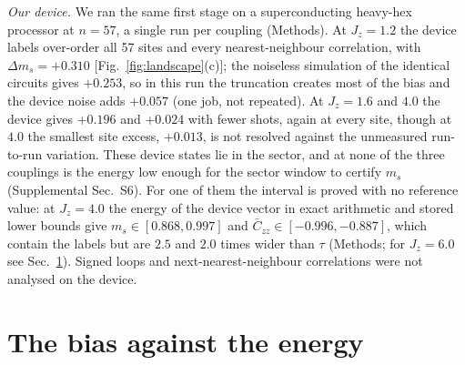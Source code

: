 \documentclass[aps,prx,twocolumn,10pt,superscriptaddress,nofootinbib,longbibliography,floatfix]{revtex4-2}
\theoremstyle{remark}
\newcommand{\Jz}{J_z}
\newcommand{\ms}{m_s}
\newcommand{\Czz}{\bar C_{zz}}
\begin{document}
\emph{Our device.} We ran the same first stage on a superconducting heavy-hex processor at $n=57$, a single run per %
coupling (Methods). At $\Jz=1.2$ the
device labels over-order all 57 sites and every nearest-neighbour correlation, with $\Delta\ms=+0.310$ %
[Fig.~\ref{fig:landscape}(c)]; the noiseless simulation of the identical circuits gives $+0.253$, so in this run the %
truncation creates most of the bias and the device noise adds $+0.057$ (one job, not repeated). At $\Jz=1.6$ and $4.0$ the device gives $+0.196$ and %
$+0.024$ with fewer shots, again at every site, though at $4.0$ the smallest site excess, $+0.013$, is not resolved %
against the unmeasured run-to-run variation. These device states lie in the sector, and at none of the three
couplings is the energy low enough for the sector window to certify $\ms$ (Supplemental Sec.~S6). For one of them the
interval is proved with no reference value: at $\Jz=4.0$ the energy of the device vector in exact arithmetic and stored
lower bounds give $\ms\in[0.868,0.997]$ and $\Czz\in[-0.996,-0.887]$, which contain the labels but are $2.5$ and $2.0$ %
times wider than $\tau$ (Methods; for $\Jz=6.0$ see Sec.~\ref{sec:predict}). Signed loops and %
next-nearest-neighbour correlations were not analysed on the device.

\section{The bias against the energy}
\label{sec:predict}
\end{document}
